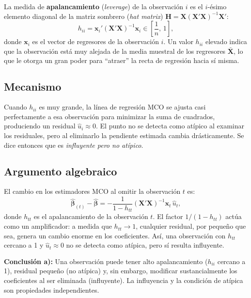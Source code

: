 \documentclass[12pt, letterpaper]{article}
\begin{document}
La medida de \textbf{apalancamiento} (\textit{leverage}) de la
observación $i$ es el $i$-ésimo elemento diagonal de la matriz sombrero
(\textit{hat matrix}) $\mathbf{H} = \mathbf{X}(\mathbf{X}'\mathbf{X})^{-1}\mathbf{X}'$:
\begin{equation}
  h_{ii} = \mathbf{x}_i'(\mathbf{X}'\mathbf{X})^{-1}\mathbf{x}_i
  \in \left[\frac{1}{n},\, 1\right],
  \label{eq:leverage}
\end{equation}
donde $\mathbf{x}_i$ es el vector de regresores de la observación $i$.
Un valor $h_{ii}$ elevado indica que la observación está muy alejada de
la media muestral de los regresores $\bar{\mathbf{X}}$, lo que le otorga
un gran poder para ``atraer'' la recta de regresión hacia sí misma.

\subsection{Mecanismo}

Cuando $h_{ii}$ es muy grande, la línea de regresión MCO se ajusta
casi perfectamente a esa observación para minimizar la suma de cuadrados,
produciendo un residual $\hat{u}_i \approx 0$. El punto no se detecta
como atípico al examinar los residuales, pero al eliminarlo la pendiente
estimada cambia drásticamente. Se dice entonces que es \emph{influyente
pero no atípico}.

\subsection{Argumento algebraico}

El cambio en los estimadores MCO al omitir la observación $t$ es:
\begin{equation}
  \hat{\boldsymbol{\beta}}_{(t)} - \hat{\boldsymbol{\beta}}
  = -\frac{1}{1 - h_{tt}}
    (\mathbf{X}'\mathbf{X})^{-1}\mathbf{x}_t\,\hat{u}_t,
  \label{eq:cambio_coef}
\end{equation}
donde $h_{tt}$ es el apalancamiento de la observación $t$. El factor
$1/(1 - h_{tt})$ actúa como un amplificador: a medida que $h_{tt} \to 1$,
cualquier residual, por pequeño que sea, genera un cambio enorme en
los coeficientes. Así, una observación con $h_{tt}$ cercano a 1 y
$\hat{u}_t \approx 0$ no se detecta como atípica, pero sí resulta
influyente.

\begin{clave}
  \textbf{Conclusión a):} Una observación puede tener alto apalancamiento
  ($h_{ii}$ cercano a 1), residual pequeño (no atípica) y, sin embargo,
  modificar sustancialmente los coeficientes al ser eliminada (influyente).
  La influyencia y la condición de atípica son propiedades independientes.
\end{clave}
\end{document}
